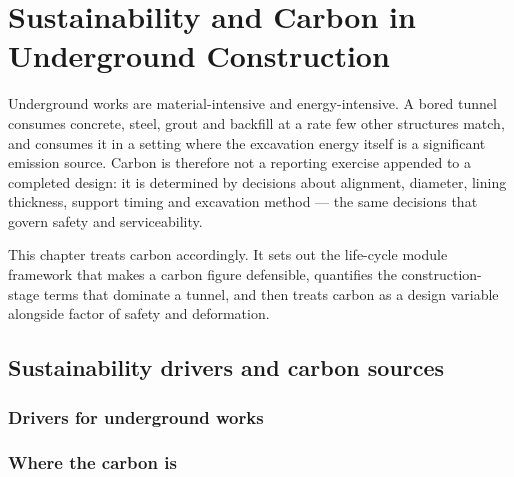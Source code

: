 \chapter{Sustainability and Carbon in Underground Construction}
\label{ch:sustainability}

Underground works are material-intensive and energy-intensive. A bored tunnel
consumes concrete, steel, grout and backfill at a rate few other structures
match, and consumes it in a setting where the excavation energy itself is a
significant emission source. Carbon is therefore not a reporting exercise
appended to a completed design: it is determined by decisions about alignment,
diameter, lining thickness, support timing and excavation method --- the same
decisions that govern safety and serviceability.

This chapter treats carbon accordingly. It sets out the life-cycle module
framework that makes a carbon figure defensible, quantifies the
construction-stage terms that dominate a tunnel, and then treats carbon as a
design variable alongside factor of safety and deformation.

\section{Sustainability drivers and carbon sources}
\label{sec:sustainability-drivers-and-carbon-sources}

\subsection{Drivers for underground works}
\label{sec:sustainability-drivers}

\subsection{Where the carbon is}
\label{sec:embodied-carbon}

